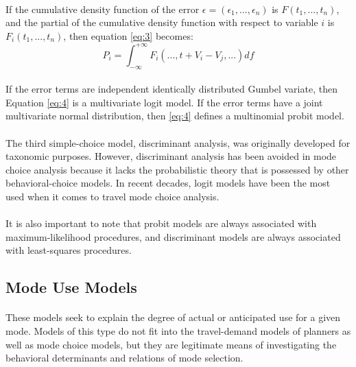 \paragraph{}If the cumulative density function of the error $\epsilon =(\epsilon_1, . . . , \epsilon_n)$ is $F(t_1, . . . , t_n)$, and the partial of the cumulative density function with respect to variable $i$ is $F_i(t_1, . . . , t_n)$, then equation \ref{eq:3} becomes:
\begin{equation}\label{eq:4}
P_i = 	\int_{-\infty}^{+\infty} F_i(. . . , t + V_i - V_j, . . .)df
\end{equation}
\paragraph{}If the error terms are independent identically distributed Gumbel variate, then Equation \ref{eq:4} is a multivariate logit model. If the error terms have a joint multivariate normal distribution, then \ref{eq:4} defines a multinomial probit model. 
\paragraph{}The third simple-choice model, discriminant analysis, was originally developed for taxonomic purposes. However, discriminant analysis has been avoided in mode choice analysis because it lacks the probabilistic theory that is possessed by other behavioral-choice models. In recent decades, logit models have been the most used when it comes to travel mode choice analysis.
\paragraph{}It is also important to note that probit models are always associated with maximum-likelihood procedures, and discriminant models are always associated with least-squares procedures.

\subsection{Mode Use Models}
\paragraph{}These models seek to explain the degree of actual or anticipated use for a given mode. Models of this type do not fit into the travel-demand models of planners as well as mode choice models, but they are legitimate means of investigating the behavioral determinants and relations of mode selection.
